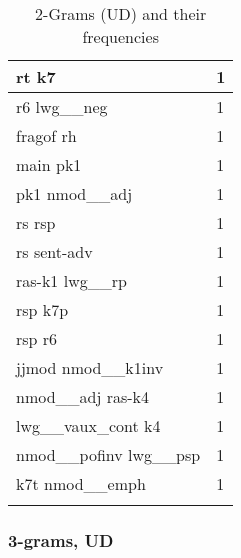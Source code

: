 \documentclass[a4 paper]{article}
\begin{document}
\begin{longtable}{p{}p{}}
rt k7  & 1 \\ \midrule
r6 lwg\_\_neg  & 1 \\ \midrule
fragof rh  & 1 \\ \midrule
main pk1  & 1 \\ \midrule
pk1 nmod\_\_adj  & 1 \\ \midrule
rs rsp  & 1 \\ \midrule
rs sent-adv  & 1 \\ \midrule
ras-k1 lwg\_\_rp  & 1 \\ \midrule
rsp k7p  & 1 \\ \midrule
rsp r6  & 1 \\ \midrule
jjmod nmod\_\_k1inv  & 1 \\ \midrule
nmod\_\_adj ras-k4  & 1 \\ \midrule
lwg\_\_vaux\_cont k4  & 1 \\ \midrule
nmod\_\_pofinv lwg\_\_psp  & 1 \\ \midrule
k7t nmod\_\_emph  & 1 \\ \midrule
    \caption{2-Grams (UD) and their frequencies}
\label{tab:ngram2ud}
\end{longtable}


\subsubsection{3-grams, UD}
\end{document}
